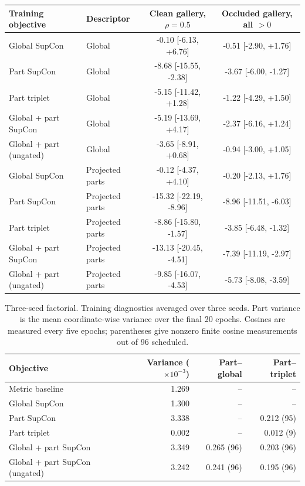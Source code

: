 \begin{table}[!htbp]
\begin{tabularx}{\textwidth}{@{}>{\raggedright\arraybackslash}Xlcc@{}}
\toprule
Training objective & Descriptor & \shortstack{Clean gallery,\\$\rho=0.5$} &
\shortstack{Occluded gallery,\\all $>0$} \\
\midrule
Global SupCon & Global & -0.10 [-6.13, +6.76] & -0.51 [-2.90, +1.76] \\
Part SupCon & Global & -8.68 [-15.55, -2.38] & -3.67 [-6.00, -1.27] \\
Part triplet & Global & -5.15 [-11.42, +1.28] & -1.22 [-4.29, +1.50] \\
Global + part SupCon & Global & -5.19 [-13.69, +4.17] & -2.37 [-6.16, +1.24] \\
Global + part (ungated) & Global & -3.65 [-8.91, +0.68] & -0.94 [-3.00, +1.05] \\
Global SupCon & Projected parts & -0.12 [-4.37, +4.10] & -0.20 [-2.13, +1.76] \\
Part SupCon & Projected parts & -15.32 [-22.19, -8.96] & -8.96 [-11.51, -6.03] \\
Part triplet & Projected parts & -8.86 [-15.80, -1.57] & -3.85 [-6.48, -1.32] \\
Global + part SupCon & Projected parts & -13.13 [-20.45, -4.51] & -7.39 [-11.19, -2.97] \\
Global + part (ungated) & Projected parts & -9.85 [-16.07, -4.53] & -5.73 [-8.08, -3.59] \\
\bottomrule
\end{tabularx}
\end{table}

\begin{table}[!htbp]
\centering
\caption{Three-seed factorial. Training diagnostics averaged over three seeds. Part variance is the
mean coordinate-wise variance over the final 20 epochs. Cosines are measured
every five epochs; parentheses give nonzero finite cosine measurements out of
96 scheduled.}
\label{tab:s-diagnostics}
\small
\setlength{\tabcolsep}{4pt}
\begin{tabular}{@{}lrrr@{}}
\toprule
Objective & Variance ($\times10^{-3}$) & Part--global & Part--triplet \\
\midrule
Metric baseline & 1.269 & -- & -- \\
Global SupCon & 1.300 & -- & -- \\
Part SupCon & 3.338 & -- & 0.212 (95) \\
Part triplet & 0.002 & -- & 0.012 (9) \\
Global + part SupCon & 3.349 & 0.265 (96) & 0.203 (96) \\
Global + part SupCon (ungated) & 3.242 & 0.241 (96) & 0.195 (96) \\
\bottomrule
\end{tabular}
\end{table}
